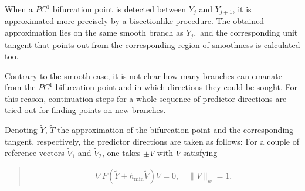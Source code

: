 \documentclass[a4paper,11pt,english]{sphinxmanual}
\begin{document}
When a \(PC^{1}\) bifurcation point is detected between \(Y_{j}\) and
\(Y_{j+1}\), it is approximated more precisely by a bisection\sphinxhyphen{}like
procedure. The obtained approximation lies on the same smooth branch as
\(Y_{j},\) and the corresponding unit tangent that points out from the
corresponding region of smoothness is calculated too.

Contrary to the smooth case, it is not clear how many branches can emanate from
the \(PC^{1}\) bifurcation point and in which directions they could be
sought. For this reason, continuation steps for a whole sequence of predictor
directions are tried out for finding points on new branches.

Denoting \(\tilde{Y}\), \(\tilde{T}\) the approximation of the
bifurcation point and the corresponding tangent, respectively, the predictor
directions are taken as follows: For a couple of reference vectors
\(\tilde{V}_{1}\) and \(\tilde{V}_{2}\), one takes \(\pm V\) with
\(V\) satisfying
\begin{quote}
\begin{equation*}
\begin{split}\nabla F(\tilde{Y}+h_{\mathrm{min}}\tilde{V}) V = 0, \quad \lVert V \rVert_{w} = 1,\end{split}
\end{equation*}\end{quote}
\end{document}
